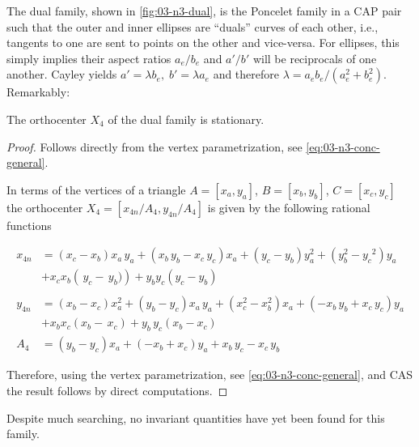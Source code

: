 
The dual family, shown in \cref{fig:03-n3-dual}, is the Poncelet family in a CAP pair such that the outer and inner ellipses are ``duals'' curves of each other, i.e., tangents to one are sent to points on the other and vice-versa. For ellipses, this simply implies their aspect ratios $a_e/b_e$ and $a'/b'$ will be reciprocals of one another. Cayley yields $a'=\lambda b_e,\; b'=\lambda a_e$ and therefore $\lambda= a_e b_e/(a_e^2+b_e^2)$. Remarkably:

\begin{proposition}
The orthocenter $X_4$ of the dual family is stationary.
\end{proposition}

\begin{proof}
Follows directly from the vertex parametrization, see \cref{eq:03-n3-conc-general}.

In terms of the vertices of a triangle $A=[x_a,y_a]$, $B=[x_b,y_b]$, $C=[x_c,y_c]$ the orthocenter $X_4=[x_{4n}/A_4,y_{4n}/A_4]$ is given by the following rational functions 

\begin{align*}
    x_{4n}&=   \left(x_c-x_b\right) x_a\,y_a+ \left( 
 x_b\,y_b-x_c\,y_c \right) x_a+ \left( y_c-y_b \right) y_a^2+ \left( y_b^2-{y_c}^{2} \right) y_a\\
&+  x_cx_b\left( \,y_c- \,y_b)
 \right) +y_by_c( y_c-y_b) \\
 \\
 y_{4n}&=  \left(x_b-x_c\right) x_a^2+ \left( y_b-y_c \right) x_a\,y_a+ \left( x_c^2-x_b^2\right) x_a+ \left( -x_b\,y_b+x_c\,y_c \right) y_a\\
 &+x_b  x_c(x_b- \,x_c)+ y_b\,y_c(x_b-x_c) \\
A_4&= \left(y_b-y_c \right) x_a+ \left( -x_b+x_c\right) y_a+x_b\,y_c-x_c\,y_b
\end{align*}

Therefore, using  the vertex parametrization, see \cref{eq:03-n3-conc-general}, and CAS the result follows by direct computations.
\end{proof}

Despite much searching, no invariant quantities have yet been found for this family.

